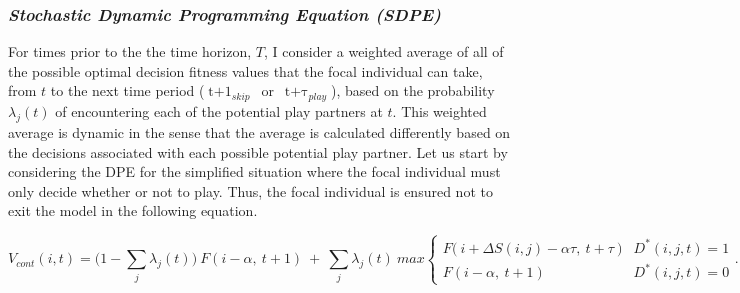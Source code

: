 \documentclass[12pt,letterpaper]{article}
\begin{document}
    \subsubsection{\it Stochastic Dynamic Programming Equation (SDPE)}
      
      For times prior to the the time horizon, $T$, I consider a weighted average of all of the possible optimal decision fitness values that the focal individual can take, from $t$ to the next time period \mbox{($\displaystyle\operatorname*{t+1}_{skip}$ or $\displaystyle\operatorname*{t+\tau}_{play}$)}, based on the probability $\lambda_j(t)$  of encountering each of the potential play partners at $t$. %
      This weighted average is dynamic in the sense that the average is calculated differently based on the decisions associated with each possible potential play partner.
      Let us start by considering the DPE for the simplified situation where the focal individual must only decide whether or not to play.
      Thus, the focal individual is ensured not to exit the model in the following equation. %

      \begin{equation*}
      V_{cont}(i,t)=\bigl(1-\sum_j \lambda_j(t) \bigr) ~F(i-\alpha,~t+1) ~+~ \sum_j \lambda_j(t)~max
      \begin{cases}
	F\bigl(~ i + \Delta S(i,j) - \alpha \tau,~t+\tau ~\bigr)                                & D^*(i,j,t)=1 \\
	F(i-\alpha,~t+1) 				                              & D^*(i,j,t)=0
      \end{cases}. 
      \end{equation*}
\end{document}
